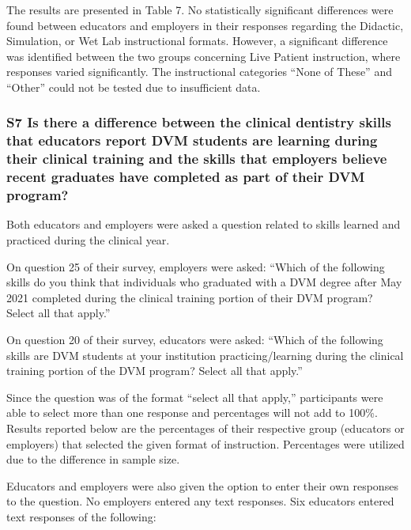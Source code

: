 \documentclass[
  11pt,
  letterpaper,
  DIV=11,
  numbers=noendperiod]{scrartcl}
\numberwithin{figure}{section}
\begin{document}
The results are presented in Table 7. No statistically significant
differences were found between educators and employers in their
responses regarding the Didactic, Simulation, or Wet Lab instructional
formats. However, a significant difference was identified between the
two groups concerning Live Patient instruction, where responses varied
significantly. The instructional categories ``None of These'' and
``Other'' could not be tested due to insufficient data.

\subsubsection{S7 Is there a difference between the clinical dentistry
skills that educators report DVM students are learning during their
clinical training and the skills that employers believe recent graduates
have completed as part of their DVM
program?}\label{s7-is-there-a-difference-between-the-clinical-dentistry-skills-that-educators-report-dvm-students-are-learning-during-their-clinical-training-and-the-skills-that-employers-believe-recent-graduates-have-completed-as-part-of-their-dvm-program}

Both educators and employers were asked a question related to skills
learned and practiced during the clinical year.

On question 25 of their survey, employers were asked: ``Which of the
following skills do you think that individuals who graduated with a DVM
degree after May 2021 completed during the clinical training portion of
their DVM program? Select all that apply.''

On question 20 of their survey, educators were asked: ``Which of the
following skills are DVM students at your institution
practicing/learning during the clinical training portion of the DVM
program? Select all that apply.''

Since the question was of the format ``select all that apply,''
participants were able to select more than one response and percentages
will not add to 100\%. Results reported below are the percentages of
their respective group (educators or employers) that selected the given
format of instruction. Percentages were utilized due to the difference
in sample size.

Educators and employers were also given the option to enter their own
responses to the question. No employers entered any text responses. Six
educators entered text responses of the following:
\end{document}
